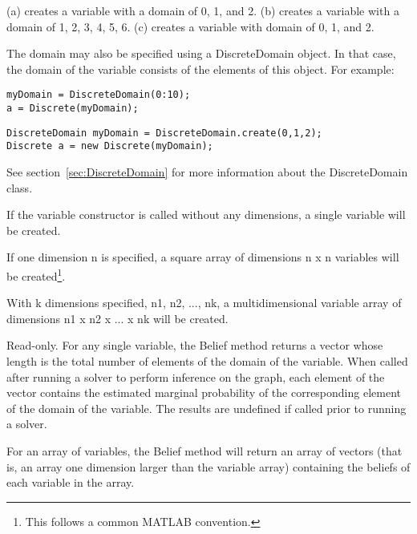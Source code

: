(a) creates a variable with a domain of 0, 1, and 2.  (b) creates a variable with a domain of 1, 2, 3, 4, 5, 6.  (c) creates a variable with domain of 0, 1, and 2.

\fi

The domain may also be specified using a DiscreteDomain object.  In that case, the domain of the variable consists of the elements of this object.  For example:

\ifmatlab
\begin{lstlisting}
myDomain = DiscreteDomain(0:10);
a = Discrete(myDomain);
\end{lstlisting}
\fi

\ifjava
\begin{lstlisting}
DiscreteDomain myDomain = DiscreteDomain.create(0,1,2);
Discrete a = new Discrete(myDomain);
\end{lstlisting}
\fi

See section~\ref{sec:DiscreteDomain} for more information about the DiscreteDomain class.

\ifmatlab
{}
\label{sec:VariableMatrixDimensions}

If the variable constructor is called without any dimensions, a single variable will be created.

If one dimension n is specified, a square array of dimensions n x n variables will be created\footnote{This follows a common MATLAB convention.}.

With k dimensions specified, n1, n2, ..., nk, a multidimensional variable array of dimensions n1 x n2 x ... x nk will be created.

\fi


\label{sec:Discrete.Belief}

Read-only.  For any single variable, the Belief method returns a vector whose length is the total number of elements of the domain of the variable.  When called after running a solver to perform inference on the graph, each element of the vector contains the estimated marginal probability of the corresponding element of the domain of the variable.  The results are undefined if called prior to running a solver.

For an array of variables, the Belief method will return an array of vectors (that is, an array one dimension larger than the variable array) containing the beliefs of each variable in the array.

\label{sec:Discrete.Value}

